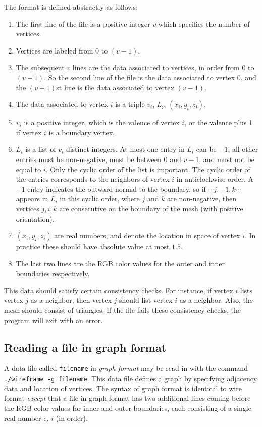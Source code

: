 \documentclass[12pt]{article}
\begin{document}
The format is defined abstractly as follows:
\begin{enumerate}
\item{The first line of the file is a positive integer $v$ which specifies the number of vertices.}
\item{Vertices are labeled from $0$ to $(v-1)$.}
\item{The subsequent $v$ lines are the data associated to vertices, in order from $0$ to $(v-1)$. So
the second line of the file is the data associated to vertex $0$, and the $(v+1)$st line is the data
associated to vertex $(v-1)$.}
\item{The data associated to vertex $i$ is a triple $v_i$, $L_i$, $(x_i, y_i, z_i)$.}
\item{$v_i$ is a positive integer, which is the valence of vertex $i$, or the valence plus 1 if 
vertex $i$ is a boundary vertex.}
\item{$L_i$ is a list of $v_i$ distinct integers. At most one entry in $L_i$ can be $-1$; all other
entries must be non-negative, must be between $0$ and $v-1$, and must not be equal to $i$.
Only the cyclic order of the list is important. The cyclic
order of the entries corresponds to the neighbors of vertex $i$ in anticlockwise order. A $-1$
entry indicates the outward normal to the boundary, so if $\cdots j, -1, k \cdots$ appears
in $L_i$ in this cyclic order, where $j$ and $k$ are non-negative, then vertices $j,i,k$ are
consecutive on the boundary of the mesh (with positive orientation).}
\item{$(x_i,y_i,z_i)$ are real numbers, and denote the location in space of vertex $i$. In
practice these should have absolute value at most $1.5$.}
\item{The last two lines are the RGB color values for the outer and inner boundaries respectively.}
\end{enumerate}

This data should satisfy certain consistency checks. For instance, if vertex $i$ lists vertex $j$
as a neighbor, then vertex $j$ should list vertex $i$ as a neighbor. Also, the mesh should
consist of triangles. If the file fails these consistency checks, the program will exit with
an error.

\subsection{Reading a file in graph format}

A data file called {\tt filename} in {\em graph format} may be read in with the command 
{\tt ./wireframe -g filename}. This data file defines a graph by specifying adjacency data 
and location of vertices. The syntax of graph format is identical to wire format
{\em except} that a file in graph format has two additional lines coming before the RGB
color values for inner and outer boundaries,
each consisting of a single real number $e$, $i$ (in order).
\end{document}

